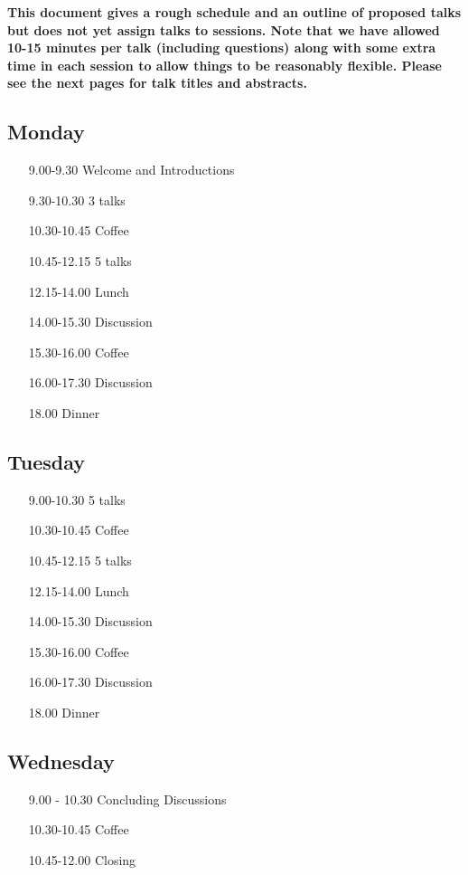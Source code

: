 \documentclass{article}
\begin{document}
\noindent
\textbf{\color{red}This document gives a rough schedule and an outline of proposed talks but does not yet assign talks to sessions. Note that we have allowed 10-15 minutes per talk (including questions) along with some extra time in each session to allow things to be reasonably flexible. Please see the next pages for talk titles and abstracts.}

\subsection*{Monday}

\begin{itemize}
	\item[9.00-9.30] Welcome and Introductions
	\item[9.30-10.30] 3 talks
	\item[10.30-10.45] Coffee
	\item[10.45-12.15] 5 talks
	\item[12.15-14.00] Lunch 
	\item[14.00-15.30] Discussion
	\item[15.30-16.00] Coffee
	\item[16.00-17.30] Discussion
	\item[18.00] Dinner
\end{itemize}

\subsection*{Tuesday}

\begin{itemize}
	\item[9.00-10.30] 5 talks
	\item[10.30-10.45] Coffee
	\item[10.45-12.15] 5 talks
	\item[12.15-14.00] Lunch 
	\item[14.00-15.30] Discussion
	\item[15.30-16.00] Coffee
	\item[16.00-17.30] Discussion
	\item[18.00] Dinner
\end{itemize}

\subsection*{Wednesday}

\begin{itemize}
	\item[9.00 - 10.30] Concluding Discussions
	\item[10.30-10.45] Coffee
	\item[10.45-12.00] Closing
\end{itemize}
\end{document}
